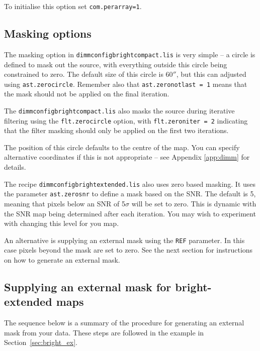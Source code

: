 \documentclass[twoside,11pt]{article}
\newcommand{\xlabel}[1]{}
\renewcommand{\_}{\texttt{\symbol{95}}}
\begin{document}
To initialise this option set \texttt{com.perarray=1}.


\subsection{\xlabel{mask}Masking options}
\label{sec:mask}

The masking option in \texttt{dimmconfig\_bright\_compact.lis} is very
simple -- a circle is defined to mask out the source, with everything
outside this circle being constrained to zero. The default size of
this circle is 60$''$, but this can adjusted using
\texttt{ast.zero\_circle}. Remember also that
\texttt{ast.zero\_notlast = 1} means that the mask should not be
applied on the final iteration.

The \texttt{dimmconfig\_bright\_compact.lis} also masks the source
during iterative filtering using the \texttt{flt.zero\_circle} option,
with \texttt{flt.zero\_niter = 2} indicating that the filter masking
should only be applied on the first two iterations.

The position of this circle defaults to the centre of the map. You can
specify alternative coordinates if this is not appropriate -- see
Appendix \ref{app:dimm} for details.

The recipe \texttt{dimmconfig\_bright\_extended.lis} also uses zero
based masking. It uses the parameter \texttt{ast.zero\_snr} to define
a mask based on the SNR. The default is 5, meaning that pixels below an
SNR of 5$\sigma$ will be set to zero. This is dynamic with the SNR map
being determined after each iteration. You may wish to experiment with
changing this level for you map.

An alternative is supplying an external mask using the \texttt{REF}
parameter. In this case pixels beyond the mask are set to zero. See
the next section for instructions on how to generate an external mask.


\subsection{\xlabel{maskbe}Supplying an external mask for bright-extended maps}
\label{sec:maskbe}

The sequence below is a summary of the procedure for generating an
external mask from your data. These steps are followed in the example
in Section~\ref{sec:bright_ex}.
\end{document}
